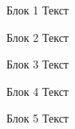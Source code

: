 \begin{frame}{}
\begin{columns}[t]
\begin{column}{0.32\linewidth}
\begin{block}{Блок 1}
				Текст
				\vspace{10cm}
			\end{block}
			\begin{block}{Блок 2}
				Текст
				\vspace{10cm}
			\end{block}
			\begin{block}{Блок 3}
				Текст
				\vspace{10cm}
			\end{block}
			\begin{block}{Блок 4}
				Текст
				\vspace{10cm}
			\end{block}
			\begin{block}{Блок 5}
				Текст
				\vspace{10cm}
			\end{block}
		\end{column}
	\end{columns}  %

\vfill

\end{frame}



